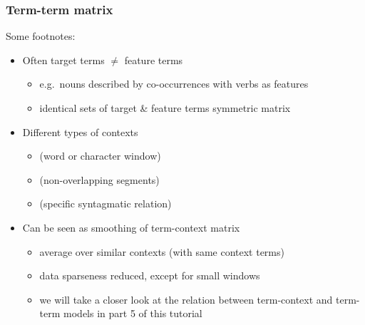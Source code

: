 \documentclass[t]{beamer} %
\begin{document}
\begin{frame}
  \frametitle{Term-term matrix}

  Some footnotes:
  \begin{itemize}
  \item Often target terms $\neq$ feature terms
    \begin{itemize}
    \item e.g.\ nouns described by co-occurrences with verbs as features
    \item identical sets of target \& feature terms \so symmetric matrix
    \end{itemize}
  \item Different types of contexts \citep{Evert:08}
    \begin{itemize}
    \item {} (word or character window)
    \item {} (non-overlapping segments)
    \item {} (specific syntagmatic relation)
    \end{itemize}
  \item Can be seen as smoothing of term-context matrix
    \begin{itemize}
    \item average over similar contexts (with same context terms)
    \item data sparseness reduced, except for small windows
    \item we will take a closer look at the relation between term-context and term-term models in part 5 of this tutorial
    \end{itemize}
  \end{itemize}

\end{frame}

\end{document}
